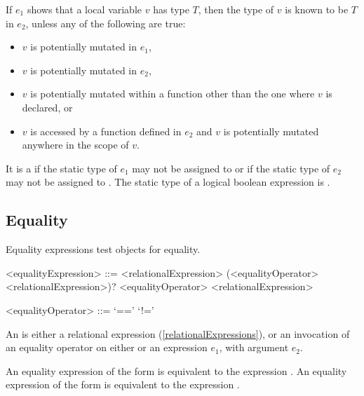 \documentclass[makeidx]{article}
\begin{document}
{\LMHash{}%
If $e_1$ shows that a local variable $v$ has type $T$,
then the type of $v$ is known to be $T$ in $e_2$,
unless any of the following are true:
\begin{itemize}
\item $v$ is potentially mutated in $e_1$,
\item $v$ is potentially mutated in $e_2$,
\item $v$ is potentially mutated within a function other
  than the one where $v$ is declared, or
\item $v$ is accessed by a function defined in $e_2$ and
  $v$ is potentially mutated anywhere in the scope of $v$.
\end{itemize}

\LMHash{}%
It is a  if
the static type of $e_1$ may not be assigned to 
or if the static type of $e_2$ may not be assigned to .
The static type of a logical boolean expression is .


\subsection{Equality}

\LMHash{}%
Equality expressions test objects for equality.

\begin{grammar}
<equalityExpression> ::= \gnewline{}
  <relationalExpression> (<equalityOperator> <relationalExpression>)?
  \alt \SUPER{} <equalityOperator> <relationalExpression>

<equalityOperator> ::= `=='
  \alt `!='
\end{grammar}

\LMHash{}%
An  is either a relational expression
(\ref{relationalExpressions}),
or an invocation of an equality operator on either \SUPER{}
or an expression $e_1$, with argument $e_2$.

\LMHash{}%
An equality expression of the form  is equivalent to
the expression .
An equality expression of the form  is equivalent to
the expression .

}
\end{document}
